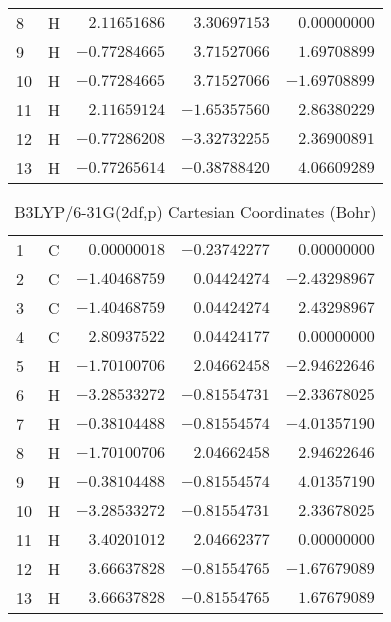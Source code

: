 \documentclass[10pt,oneside]{article}
\begin{document}
\begin{table}[h!]
\begin{multicols}{2}
\begin{tabular}{llrrr}
8  & H  & $ 2.11651686$ & $ 3.30697153$ & $ 0.00000000$ \\
9  & H  & $-0.77284665$ & $ 3.71527066$ & $ 1.69708899$ \\
10 & H  & $-0.77284665$ & $ 3.71527066$ & $-1.69708899$ \\
11 & H  & $ 2.11659124$ & $-1.65357560$ & $ 2.86380229$ \\
12 & H  & $-0.77286208$ & $-3.32732255$ & $ 2.36900891$ \\
13 & H  & $-0.77265614$ & $-0.38788420$ & $ 4.06609289$ \\
\bottomrule
\end{tabular}
\end{multicols}
\end{table}

\begin{table}[h]
\centering
\caption{B3LYP/6-31G(2df,p) Cartesian Coordinates (Bohr)}
\begin{tabular}{llrrr}
\toprule
1  & C  & $ 0.00000018$ & $-0.23742277$ & $ 0.00000000$ \\
2  & C  & $-1.40468759$ & $ 0.04424274$ & $-2.43298967$ \\
3  & C  & $-1.40468759$ & $ 0.04424274$ & $ 2.43298967$ \\
4  & C  & $ 2.80937522$ & $ 0.04424177$ & $ 0.00000000$ \\
5  & H  & $-1.70100706$ & $ 2.04662458$ & $-2.94622646$ \\
6  & H  & $-3.28533272$ & $-0.81554731$ & $-2.33678025$ \\
7  & H  & $-0.38104488$ & $-0.81554574$ & $-4.01357190$ \\
8  & H  & $-1.70100706$ & $ 2.04662458$ & $ 2.94622646$ \\
9  & H  & $-0.38104488$ & $-0.81554574$ & $ 4.01357190$ \\
10 & H  & $-3.28533272$ & $-0.81554731$ & $ 2.33678025$ \\
11 & H  & $ 3.40201012$ & $ 2.04662377$ & $ 0.00000000$ \\
12 & H  & $ 3.66637828$ & $-0.81554765$ & $-1.67679089$ \\
13 & H  & $ 3.66637828$ & $-0.81554765$ & $ 1.67679089$ \\
\bottomrule
\end{tabular}
\end{table}
\end{document}
